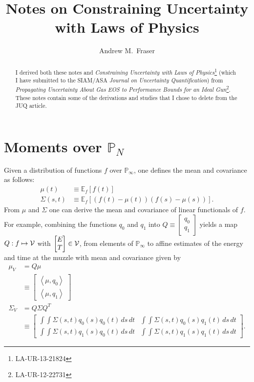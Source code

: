 \documentclass[]{article}
\title{Notes on Constraining Uncertainty with Laws of Physics}
\author{Andrew M.\ Fraser}
\newcommand{\field}[1]{\mathbb{#1}}
\newcommand\Polytope[1]{\field{P}_{#1}}
\newcommand\PolytopeN{\Polytope{N}}
\newcommand\PolytopeInf{\Polytope{\infty}}
\newcommand{\EV}[2]{\field{E}_{#1}\left[#2\right]}
\newcommand\inner[2]{\left<#1,#2\right>}
\begin{document}
\tableofcontents
\maketitle
\begin{abstract}
  I derived both these notes and \emph{Constraining Uncertainty with
    Laws of Physics}\footnote{LA-UR-13-21824} (which I have submitted
  to the SIAM/ASA \emph{Journal on Uncertainty Quantification}) from
  \emph{Propagating Uncertainty About Gas EOS to Performance Bounds
    for an Ideal Gun}\footnote{LA-UR-12-22731}.  These notes contain
  some of the derivations and studies that I chose to delete from the
  JUQ article.
\end{abstract}

\section{Moments over $\PolytopeN$}
\label{sec:moments}

Given a distribution of functions $f$ over $\PolytopeInf$, one
defines the mean and covariance as follows:
\begin{align*}
  \mu(t) &\equiv \EV{f}{f(t)} \\
  \Sigma(s,t) &\equiv \EV{f}{(f(t)-\mu(t))(f(s)-\mu(s))}.
\end{align*}
From $\mu$ and $\Sigma$ one can derive the mean and covariance of
linear functionals of $f$.  For example, combining the functions $q_0$
and $q_1$ into $Q \equiv \begin{bmatrix} q_0\\q_1 \end{bmatrix}$
yields a map $Q:f\mapsto {\cal V}$ with $\begin{bmatrix}
  E\\T \end{bmatrix}\in {\cal V}$, from elements of $\PolytopeInf$ to
affine estimates of the energy and time at the muzzle with mean and
covariance given by
\begin{subequations}
  \label{eq:qmoments}
  \begin{align}
    \mu_V &= Q \mu\\
    &\equiv \begin{bmatrix} \inner{\mu}{q_0} \\
      \inner{\mu}{q_1} \end{bmatrix}\\
    \Sigma_V &= Q\Sigma Q^T \\
    &\equiv
    \begin{bmatrix}
      \int\int \Sigma(s,t) q_0(s) q_0(t) \,ds \,dt & \int\int
      \Sigma(s,t) q_0(s) q_1(t) \,ds \,dt \\
      \int\int \Sigma(s,t) q_1(s) q_0(t) \,ds \,dt & \int\int
      \Sigma(s,t) q_1(s) q_1(t) \,ds \,dt
    \end{bmatrix}.
  \end{align}
\end{subequations}
\end{document}
